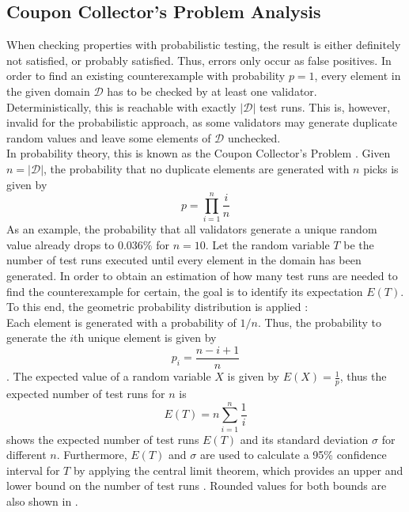 \subsection{Coupon Collector's Problem Analysis}\label{sec:coupon}
When checking properties with probabilistic testing, the result is either definitely not satisfied, or probably satisfied. Thus, errors only occur as false positives. In order to find an existing counterexample with probability $p = 1$, every element in the given domain $\mathcal{D}$ has to be checked by at least one validator. Deterministically, this is reachable with exactly $|\mathcal{D}|$ test runs. This is, however, invalid for the probabilistic approach, as some validators may generate duplicate random values and leave some elements of $\mathcal{D}$ unchecked. \\
In probability theory, this is known as the Coupon Collector's Problem \cite{croucher_collecting_2006}. Given $n = |\mathcal{D}|$, the probability that no duplicate elements are generated with $n$ picks is given by
\begin{equation*}
    p = \prod_{i=1}^{n} \frac{i}{n}
\end{equation*}
As an example, the probability that all validators generate a unique random value already drops to $0.036\%$ for $n = 10$. Let the random variable $T$ be the number of test runs executed until every element in the domain has been generated. In order to obtain an estimation of how many test runs are needed to find the counterexample for certain, the goal is to identify its expectation $E(T)$. To this end, the geometric probability distribution is applied \cite{croucher_collecting_2006}:\\
Each element is generated with a probability of $1/n$. Thus, the probability to generate the $i$th unique element is given by 
\begin{equation}
    p_i = \frac{n-i+1}{n}
\end{equation}
\cite{croucher_collecting_2006}. The expected value of a random variable $X$ is given by $E(X) = \frac{1}{p}$\cite{croucher_collecting_2006}, thus the expected number of test runs for $n$ is 
\begin{equation}
E(T) = n \sum_{i=1}^{n} \frac{1}{i}
\end{equation}
 shows the expected number of test runs $E(T)$ and its standard deviation $\sigma$ for different $n$. Furthermore, $E(T)$ and $\sigma$ are used to calculate a 95\% confidence interval for $T$ by applying the central limit theorem, which provides an upper and lower bound on the number of test runs \cite{croucher_collecting_2006}. Rounded values for both bounds are also shown in .
